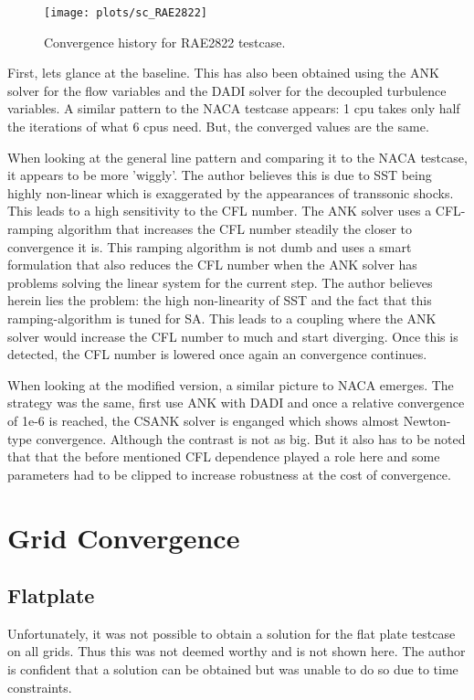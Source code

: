 \begin{figure}[H] \centering
    \texttt{[image: plots/sc\_RAE2822]}
    \caption{Convergence history for RAE2822 testcase.}
    \label{fig:sc_RAE2822}
\end{figure}

\noindent First, lets glance at the baseline. This has also been obtained
using the ANK solver for the flow variables and the DADI solver for the
decoupled turbulence variables. A similar pattern to the NACA
testcase appears: 1 cpu takes only half the iterations of what 6 cpus need.
But, the converged values are the same. 

When looking at the general line pattern and comparing it to the NACA testcase,
it appears to be more 'wiggly'. The author believes this is due to SST being
highly non-linear which is exaggerated by the appearances of transsonic shocks.
This leads to a high sensitivity to the CFL number. The ANK solver uses a
CFL-ramping algorithm that increases the CFL number steadily the closer to
convergence it is. This ramping algorithm is not dumb and uses a smart
formulation that also reduces the CFL number when the ANK solver has problems
solving the linear system for the current step. The author believes herein lies
the problem: the high non-linearity of SST and the fact that this
ramping-algorithm is tuned for SA. This leads to a coupling where the ANK
solver would increase the CFL number to much and start diverging. Once this is
detected, the CFL number is lowered once again an convergence continues. 

When looking at the modified version, a similar picture to NACA emerges. The
strategy was the same, first use ANK with DADI and once a relative convergence
of 1e-6 is reached, the CSANK solver is enganged which shows almost Newton-type
convergence. Although the contrast is not as big. But it also has to be noted
that that the before mentioned CFL dependence played a role here and some
parameters had to be clipped to increase robustness at the cost of convergence.








\section{Grid Convergence}
\subsection{Flatplate}
Unfortunately, it was not possible to obtain a solution for the flat plate
testcase on all grids. Thus this was not deemed worthy and is not shown here.
The author is confident that a solution can be obtained but was unable to do so
due to time constraints.

